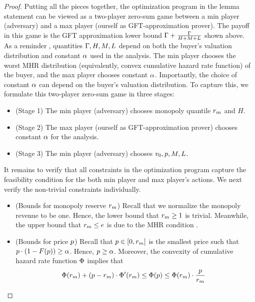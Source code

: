 \begin{proof}
     Putting all the pieces together, the optimization program in the lemma statement can be viewed as a two-player zero-sum game between a min player (adversary) and a max player (ourself as GFT-approximation prover). The payoff in this game is the GFT approximation lower bound $\Gamma + \frac{\Gamma}{H + M + L}$ shown above. As a reminder
    , quantities $\Gamma, H, M, L$ depend on both the buyer's valuation distribution and constant $\alpha$ used in the analysis. The min player chooses the worst MHR distribution (equivalently, convex cumulative hazard rate function) of the buyer, and the max player chooses constant $\alpha$. Importantly, the choice of constant $\alpha$ can depend on the buyer's valuation distribution. To capture this, we formulate this two-player zero-sum game in three stages: 
    \begin{itemize}
        \item (Stage 1) The min player (adversary) chooses monopoly quantile $r_m$ and $H$.
        \item (Stage 2) The max player (ourself as GFT-approximation prover) chooses constant $\alpha$ for the analysis.
        \item (Stage 3) The min player (adversary) chooses $v_0, p, M, L$.
    \end{itemize}
    It remains to verify that all constraints in the optimization program capture the feasibility condition for the both min player and max player's actions. We next verify the non-trivial constraints individually. 
    \begin{itemize}
        \item (Bounds for monopoly reserve $r_m$) Recall that we normalize the monopoly revenue to be one. Hence, the lower bound that $r_m \geq 1$ is trivial. Meanwhile, the upper bound that $r_m \leq e$ is due to the MHR condition \citep[Lemma~1 in][]{AGM-09}.
        \item (Bounds for price $p$) Recall that $p\in[0, r_m]$ is the smallest price such that $p\cdot (1 - F(p)) \geq \alpha$. Hence, $p \geq \alpha$.
        Moreover, the convexity of cumulative hazard rate function $\Phi$ implies that 
        \begin{align*}
            \cumhazard(\optreserve) + (\price - \optreserve)\cdot \cumhazard'(\optreserve) \leq \cumhazard(\price) \leq \cumhazard(\optreserve) \cdot \frac{\price}{\optreserve}

\end{align*}
\end{itemize}
\end{proof}
